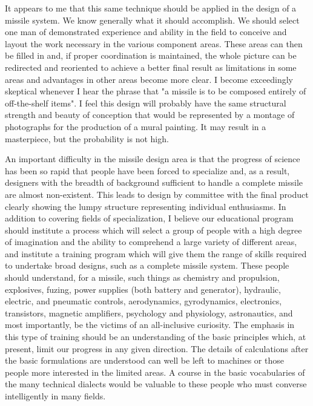 \documentclass[twocolumn]{memoir}
\begin{document}
It appears to me that this same technique should be applied in the design of a missile system. We know generally what it should accomplish. We should select one man of demonstrated experience and ability in the field to conceive and layout the work necessary in the various component areas. These areas can then be filled in and, if proper coordination is maintained, the whole picture can be redirected and reoriented to achieve a better final result as limitations in some areas and advantages in other areas become more clear. I become exceedingly skeptical whenever I hear the phrase that "a missile is to be composed entirely of off-the-shelf items". I feel this design will probably have the same structural strength and beauty of conception that would be represented by a montage of photographs for the production of a mural painting. It may result in a masterpiece, but the probability is not high.

An important difficulty in the missile design area is that the progress of science has been so rapid that people have been forced to specialize and, as a result, designers with the breadth of background sufficient to handle a complete missile are almost non-existent. This leads to design by committee with the final product clearly showing the lumpy structure representing individual enthusiasms. In addition to covering fields of specialization, I believe our educational program should institute a process which will select a group of people with a high degree of imagination and the ability to comprehend a large variety of different areas, and institute a training program which will give them the range of skills required to undertake broad designs, such as a complete missile system. These people should understand, for a missile, such things as chemistry and propulsion, explosives, fuzing, power supplies (both battery and generator), hydraulic, electric, and pneumatic controls, aerodynamics, gyrodynamics, electronics, transistors, magnetic amplifiers, psychology and physiology, astronautics, and most importantly, be the victims of an all-inclusive curiosity. The emphasis in this type of training should be an understanding of the basic principles which, at present, limit our progress in any given direction. The details of calculations after the basic formulations are understood can well be left to machines or those people more interested in the limited areas. A course in the basic vocabularies of the many technical dialects would be valuable to these people who must converse intelligently in many fields.
\end{document}
